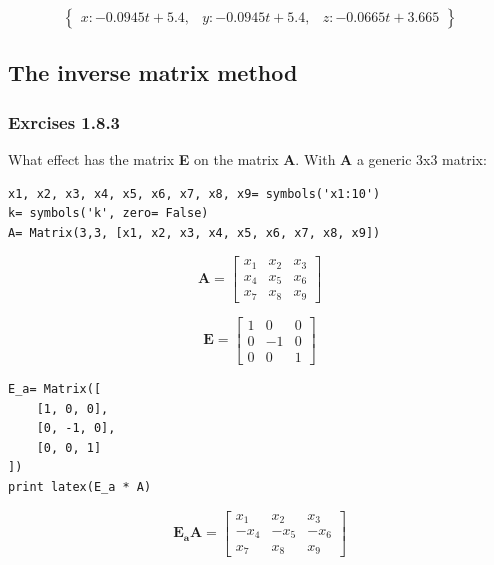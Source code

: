 \begin{equation}\label{eq:ex1_7_11}
\begin{Bmatrix}x : - 0.0945 t + 5.4, & y : - 0.0945 t + 5.4, & z : - 0.0665 t + 3.665\end{Bmatrix}
\end{equation}

\subsection{The inverse matrix method}

\subsubsection{Exrcises 1.8.3}

What effect has the matrix \textbf{E} on the matrix \textbf{A}. With \textbf{A}
a generic 3x3 matrix:

\begin{verbatim}
x1, x2, x3, x4, x5, x6, x7, x8, x9= symbols('x1:10')
k= symbols('k', zero= False)
A= Matrix(3,3, [x1, x2, x3, x4, x5, x6, x7, x8, x9])
\end{verbatim}

\begin{equation}\label{eq:1_8_3A}
\mathbf{A} = \left[\begin{matrix}x_{1} & x_{2} & x_{3}\\x_{4} & x_{5} & x_{6}\\x_{7} & x_{8} & x_{9}\end{matrix}\right]
\end{equation}

\begin{equation}\label{eq:}
\mathbf{E} = \left[\begin{matrix}1 & 0 & 0\\0 & -1 & 0\\0 & 0 & 1\end{matrix}\right]
\end{equation}

\begin{verbatim}
E_a= Matrix([
    [1, 0, 0],
    [0, -1, 0],
    [0, 0, 1]
])
print latex(E_a * A)
\end{verbatim}

\begin{equation}\label{eq:}
\mathbf{E_aA} = \left[\begin{matrix}x_{1} & x_{2} & x_{3}\\- x_{4} & - x_{5} & - x_{6}\\x_{7} & x_{8} & x_{9}\end{matrix}\right]
\end{equation}

